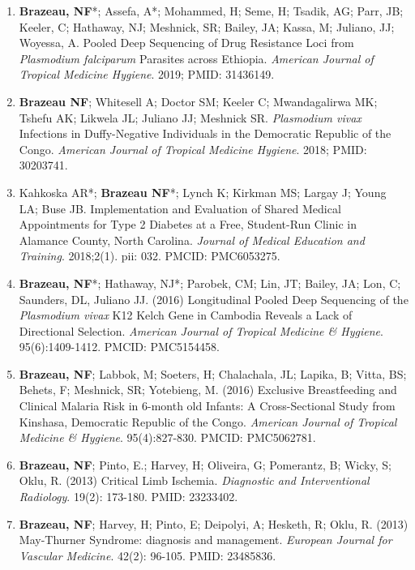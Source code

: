 \documentclass[11pt,letterpaper]{article}
\begin{document}
\begin{enumerate}[leftmargin=*, itemsep=4pt, parsep=0pt]
\item \textbf{Brazeau, NF}*; Assefa, A*; Mohammed, H; Seme, H; Tsadik, AG; Parr, JB; Keeler, C; Hathaway, NJ; Meshnick, SR; Bailey, JA; Kassa, M; Juliano, JJ; Woyessa, A. Pooled Deep Sequencing of Drug Resistance Loci from \textit{Plasmodium falciparum} Parasites across Ethiopia. \textit{American Journal of Tropical Medicine Hygiene}. 2019; PMID: 31436149.

\item \textbf{Brazeau NF}; Whitesell A; Doctor SM; Keeler C; Mwandagalirwa MK; Tshefu AK; Likwela JL; Juliano JJ; Meshnick SR. \textit{Plasmodium vivax} Infections in Duffy-Negative Individuals in the Democratic Republic of the Congo. \textit{American Journal of Tropical Medicine Hygiene}. 2018; PMID: 30203741.

\item Kahkoska AR*; \textbf{Brazeau NF}*; Lynch K; Kirkman MS; Largay J; Young LA; Buse JB. Implementation and Evaluation of Shared Medical Appointments for Type 2 Diabetes at a Free, Student-Run Clinic in Alamance County, North Carolina. \textit{Journal of Medical Education and Training}. 2018;2(1). pii: 032. PMCID: PMC6053275.

\item \textbf{Brazeau, NF}*; Hathaway, NJ*; Parobek, CM; Lin, JT; Bailey, JA; Lon, C; Saunders, DL, Juliano JJ. (2016) Longitudinal Pooled Deep Sequencing of the \textit{Plasmodium vivax} K12 Kelch Gene in Cambodia Reveals a Lack of Directional Selection. \textit{American Journal of Tropical Medicine \& Hygiene}. 95(6):1409-1412. PMCID: PMC5154458.

\item \textbf{Brazeau, NF}; Labbok, M; Soeters, H; Chalachala, JL; Lapika, B; Vitta, BS; Behets, F; Meshnick, SR; Yotebieng, M. (2016) Exclusive Breastfeeding and Clinical Malaria Risk in 6-month old Infants: A Cross-Sectional Study from Kinshasa, Democratic Republic of the Congo. \textit{American Journal of Tropical Medicine \& Hygiene}. 95(4):827-830. PMCID: PMC5062781.

\item \textbf{Brazeau, NF}; Pinto, E.; Harvey, H; Oliveira, G; Pomerantz, B; Wicky, S; Oklu, R. (2013) Critical Limb Ischemia. \textit{Diagnostic and Interventional Radiology}. 19(2): 173-180. PMID: 23233402.

\item \textbf{Brazeau, NF}; Harvey, H; Pinto, E; Deipolyi, A; Hesketh, R; Oklu, R. (2013) May-Thurner Syndrome: diagnosis and management. \textit{European Journal for Vascular Medicine}. 42(2): 96-105. PMID: 23485836.

\end{enumerate}
\end{document}
